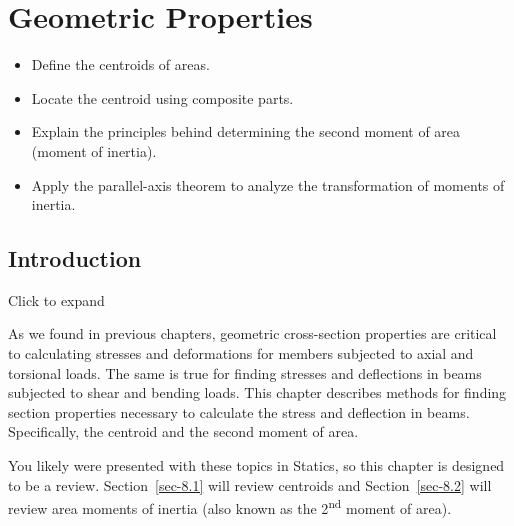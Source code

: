 \documentclass[
  letterpaper,
  DIV=11,
  numbers=noendperiod]{scrreprt}
\providecommand{\tightlist}{%
  \setlength{\itemsep}{0pt}\setlength{\parskip}{0pt}}\usepackage{longtable,booktabs,array}
\theoremstyle{definition}
\theoremstyle{remark}
\begin{document}

\chapter{Geometric Properties}\label{sec-geometric-properties}

\begin{tcolorbox}[enhanced jigsaw, colback=white, colframe=quarto-callout-note-color-frame, toptitle=1mm, arc=.35mm, bottomrule=.15mm, toprule=.15mm, opacitybacktitle=0.6, title={Learning Objectives}, coltitle=black, breakable, colbacktitle=quarto-callout-note-color!10!white, bottomtitle=1mm, titlerule=0mm, opacityback=0, leftrule=.75mm, left=2mm, rightrule=.15mm]

\begin{itemize}
\tightlist
\item
  Define the centroids of areas.
\item
  Locate the centroid using composite parts.
\item
  Explain the principles behind determining the second moment of area
  (moment of inertia).
\item
  Apply the parallel-axis theorem to analyze the transformation of
  moments of inertia.
\end{itemize}

\end{tcolorbox}

\section*{Introduction}\label{introduction-7}


Click to expand

As we found in previous chapters, geometric cross-section properties are
critical to calculating stresses and deformations for members subjected
to axial and torsional loads. The same is true for finding stresses and
deflections in beams subjected to shear and bending loads. This chapter
describes methods for finding section properties necessary to calculate
the stress and deflection in beams. Specifically, the centroid and the
second moment of area.

You likely were presented with these topics in Statics, so this chapter
is designed to be a review. Section~\ref{sec-8.1} will review centroids
and Section~\ref{sec-8.2} will review area moments of inertia (also
known as the 2\textsuperscript{nd} moment of area).
\end{document}
